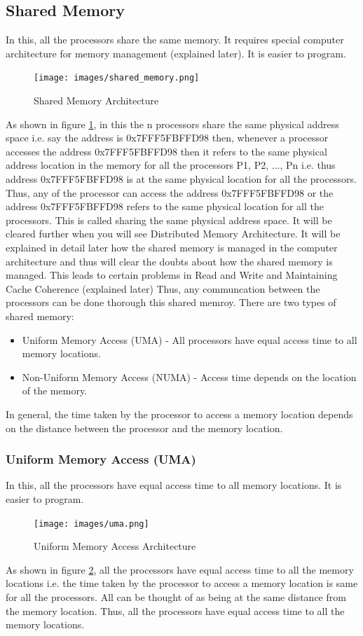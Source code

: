 \documentclass[12pt]{article}
\begin{document}
\subsection{Shared Memory}
In this, all the processors share the same memory. It requires special computer architecture for memory management (explained later). 
It is easier to program.
\begin{figure}[H]
    \centering
    \texttt{[image: images/shared\_memory.png]}
    \caption{Shared Memory Architecture}
    \label{fig:shared_memory}
\end{figure}
As shown in figure \ref{fig:shared_memory}, in this the n processors share the same physical address space i.e.
say the address is 0x7FFF5FBFFD98 then, whenever a processor accesses the address 0x7FFF5FBFFD98 then it refers to the same physical address location in the memory 
for all the processors P1, P2, ..., Pn i.e. thus address 0x7FFF5FBFFD98 is at the same physical location for
all the processors. Thus, any of the processor can access the address 0x7FFF5FBFFD98 or the address 0x7FFF5FBFFD98 refers to the 
same physical location for all the processors. This is called sharing the same physical address space.
It will be cleared further when you will see Distributed Memory Architecture.
It will be explained in detail later how the shared memory is managed in the computer architecture and thus will clear the doubts about how the shared memory is managed. 
This leads to certain problems in Read and Write and Maintaining Cache Coherence (explained later)
Thus, any communcation between the processors can be done thorough this shared memroy. 
There are two types of shared memory:
\begin{itemize}
    \item Uniform Memory Access (UMA) - All processors have equal access time to all memory locations.
    \item Non-Uniform Memory Access (NUMA) - Access time depends on the location of the memory.
\end{itemize}
In general, the time taken by the processor to access a memory location depends on the 
distance between the processor and the memory location.
\subsubsection{Uniform Memory Access (UMA)}
In this, all the processors have equal access time to all memory locations. It is easier to program.
\begin{figure}[H]
    \centering
    \texttt{[image: images/uma.png]}
    \caption{Uniform Memory Access Architecture}
    \label{fig:uma}
\end{figure}
As shown in figure \ref{fig:uma}, all the processors have equal access time to all the memory locations i.e.
the time taken by the processor to access a memory location is same for all the processors. All can be thought of as being at 
the same distance from the memory location. Thus, all the processors have equal access time to all the memory locations.
\end{document}

